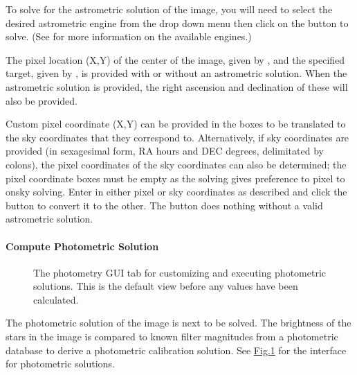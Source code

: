 \documentclass[letterpaper,11pt,english]{sphinxmanual}
\begin{document}
\sphinxAtStartPar
To solve for the astrometric solution of the image, you will need to select
the desired astrometric engine from the drop down menu then click on the
 button to solve.
(See {\hyperref[\detokenize{technical/architecture/services_engines:technical-architecture-services-engines}]{}} for more information on
the available engines.)

\sphinxAtStartPar
The pixel location (X,Y) of the center of the image, given by
, and the specified target, given by
, is provided with or without an astrometric
solution. When the astrometric solution is provided, the right ascension and
declination of these will also be provided.

\sphinxAtStartPar
Custom pixel coordinate (X,Y) can be provided in the boxes to be translated to
the sky coordinates that they correspond to. Alternatively, if sky coordinates
are provided (in sexagesimal form, RA hours and DEC degrees, delimitated by
colons), the pixel coordinates of the sky coordinates can also be determined;
the pixel coordinate boxes must be empty as the solving gives preference to
pixel to on\sphinxhyphen{}sky solving. Enter in either pixel or sky coordinates as described
and click the  button to convert it to the other. The
button does nothing without a valid astrometric solution.


\paragraph{Compute Photometric Solution}
\label{\detokenize{user/manual_mode:compute-photometric-solution}}\label{\detokenize{user/manual_mode:user-manual-mode-procedure-find-asteroid-location-compute-photometric-solution}}
\begin{figure}[H]
\centering
\capstart

\noindent{}
\caption{The photometry GUI tab for customizing and executing photometric solutions.
This is the default view before any values have been calculated.}\label{\detokenize{user/manual_mode:id6}}\label{\detokenize{user/manual_mode:figure-manual-mode-gui-photometry}}\end{figure}

\sphinxAtStartPar
The photometric solution of the image is next to be solved. The brightness of
the stars in the image is compared to known filter magnitudes from a
photometric database to derive a photometric calibration solution.
See \hyperref[\detokenize{user/manual_mode:figure-manual-mode-gui-photometry}]{Fig.\@ \ref{\detokenize{user/manual_mode:figure-manual-mode-gui-photometry}}} for the interface for
photometric solutions.
\end{document}
